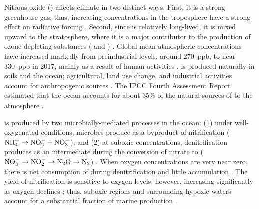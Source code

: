 \documentclass[draft,linenumbers]{report_chapter}
\begin{document}
Nitrous oxide () affects climate in two distinct ways.
First, it is a strong greenhouse gas; thus, increasing  concentrations in the troposphere have a strong effect on radiative forcing \citep{IPCC-2007}.
Second, since  is relatively long-lived, it is mixed upward to the stratosphere, where it is a major contributor to the production of ozone depleting substances ( and ) \citep{WMO-2011,Wuebbles-2009}.
Global-mean atmospheric  concentrations have increased markedly from preindustrial levels, around 270~ppb, to near 330~ppb in 2017, mainly as a result of human activities \citep[][NOAA ESRL Global Monitoring Division,
 Boulder, Colorado, USA]{Forster-Ramaswamy-etal-2007}.
 is produced naturally in soils and the ocean; agricultural, land use change, and industrial activities account for anthropogenic sources \citep{Denman-Brasseur-etal-2007}.
The IPCC Fourth Assessment Report estimated that the ocean accounts for about 35\% of the natural sources of  to the atmosphere \citep{Denman-Brasseur-etal-2007}.

 is produced by two microbially-mediated processes in the ocean: (1) under well-oxygenated conditions, microbes produce  as a byproduct of  nitrification
($\ce{NH4}^+\rightarrow\ce{NO2}^-+\ce{NO3}^-$); and (2) at suboxic concentrations, denitrification produces  as an intermediate during the conversion of nitrate to 
($\ce{NO3}^-\rightarrow\ce{NO2}^-\rightarrow\ce{N2O}\rightarrow\ce{N2}$)
\citep{Bange-Freing-etal-2010}.
When oxygen concentrations are very near zero, there is net consumption of  during denitrification and little  accumulation \citep{Bange-Freing-etal-2010}.
The  yield of nitrification is sensitive to oxygen levels, however, increasing significantly as oxygen declines \citep[e.g.,][]{Santoro-Buchwald-etal-2011,Loscher-Kock-etal-2012}; thus, suboxic regions and surrounding hypoxic waters account for a substantial fraction of marine  production \citep{Codispoti-2010}.
\end{document}
